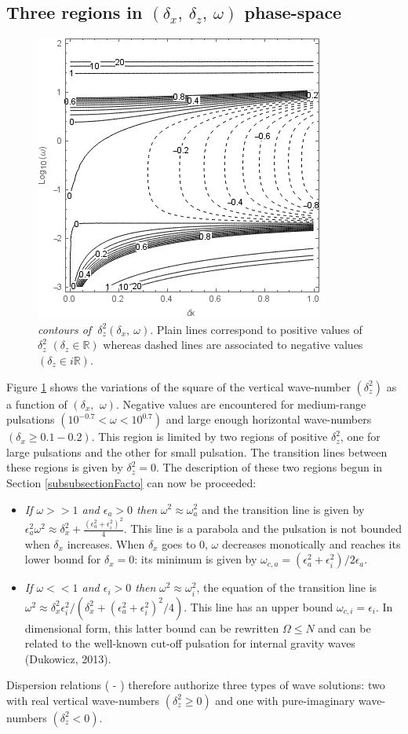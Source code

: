 \documentclass[a4paper,11pt]{article}
\begin{document}
\subsection{Three regions in $(\delta_x,\ \delta_z,\ \omega)$ phase-space}
\label{SubSectionDeltaz}
\begin{figure}[!h]
	\centering	
	\includegraphics[width=0.5\linewidth]{FIGURES/Contour_dz.png}
	\caption{\textit{contours of $\ \delta_z^2(\delta_x,\ \omega)$}. Plain lines correspond to positive values of $\delta_z^2$ $(\delta_z\in\mathbb{R})$ whereas dashed lines are associated to negative values $(\delta_z\in i\mathbb{R})$.}
	\label{FigContourdz}
\end{figure}
Figure \ref{FigContourdz} shows the variations of the square of the vertical wave-number $(\delta_z^2)$ as a function of $(\delta_x,\ \,\omega)$.  Negative values are encountered for medium-range pulsations $(10^{-0.7}<\omega<10^{0.7})$ and large enough horizontal wave-numbers $(\delta_x \geq 0.1-0.2)$. This region is limited by two regions of positive $\delta_z^2$, one for large pulsations and the other for small pulsation. The transition lines between these regions is given by $\delta_z^2=0$. The description of these two regions begun in Section \ref{subsubsectionFacto} can now be proceeded:
\begin{itemize}
	\item \textit{If $\omega>>1$ and $\epsilon_a>0$ then} $\omega^2\approx\omega_a^2$ and the transition line is given by 
	$\epsilon_a^2\omega^2 \approx
	\delta_x^2
 	+\frac{(\epsilon_a^2+\epsilon_i^2)^2}{4}$. This line is a parabola and the pulsation is not bounded when $\delta_x$ increases. 
 	When $\delta_x$ goes to 0, $\omega$ decreases monotically and reaches its lower bound for $\delta_x=0$: its minimum is given by $\omega_{c,a}=(\epsilon_a^2+\epsilon_i^2)/2\epsilon_a$.
	\item \textit{If $\omega<<1$ and $\epsilon_i>0$ then} $\omega^2\approx\omega_i^2$, the equation of the transition line is $\omega^2\approx\delta_x^2\epsilon_i^2/(\delta_x^2+(\epsilon_a^2+\epsilon_i^2)^2/4)$. This line has an upper bound $\omega_{c,i}=\epsilon_i$.
	In dimensional form, this latter bound can be rewritten $\Omega\leq N$ and can be related to the well-known cut-off pulsation for internal gravity waves (Dukowicz, 2013).
\end{itemize}
Dispersion relations ( - ) therefore authorize three types of wave solutions: two with real vertical wave-numbers $(\delta_z^2\geq0)$ and one with pure-imaginary wave-numbers $(\delta_z^2<0)$.
\end{document}

